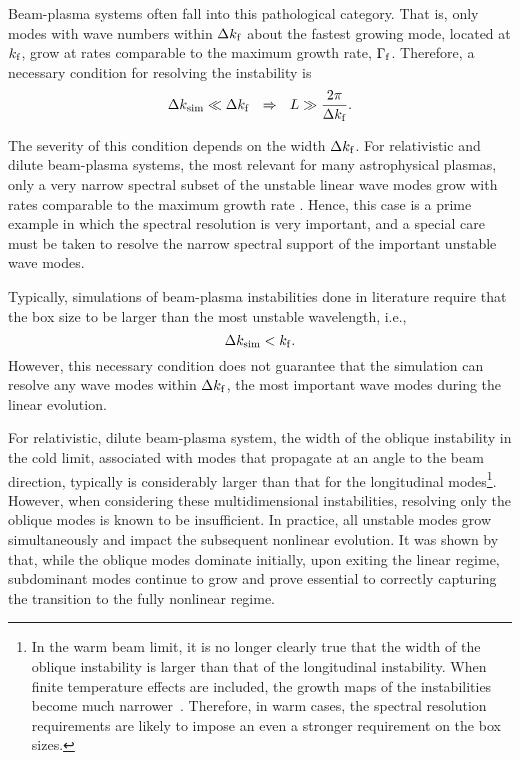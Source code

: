 \documentclass[pop,numberedappendix,iop]{aeb_emulateapj_2015}
\begin{document}
Beam-plasma systems often fall into this pathological category.
That is, only modes with wave numbers within $\Delta k_{\rm f}$ about the fastest growing mode, located at $k_{\rm f}$, grow at rates comparable to the maximum growth rate, $\Gamma_{\rm f}$.  
Therefore, a necessary condition for resolving the instability is
\begin{eqnarray}
\label{eq:spec-res}
\Delta k_{\rm sim} \ll \Delta k_{\rm f }
~~\Rightarrow~~
L \gg \frac{2\pi}{\Delta k_{\rm f}}.
\end{eqnarray}


The severity of this condition depends on the width $\Delta k_{\rm f}$.
For relativistic and dilute beam-plasma systems, the most relevant for many astrophysical plasmas, only a very narrow spectral subset of the unstable linear wave modes grow with rates comparable to the maximum growth rate \citep{Bret2010}.
Hence, this case is a prime example in which the spectral resolution is very important, and a special care must be taken to resolve the narrow spectral support of the important unstable wave modes.

Typically, simulations of beam-plasma instabilities done in literature require that the box size to be larger than the most unstable wavelength, i.e.,
\begin{equation}
 \Delta k_{\rm sim} < k_{\rm f}.
\end{equation}
However, this necessary condition does not guarantee that the simulation can resolve any wave modes within $\Delta k_{\rm f}$, the most important wave modes during the linear evolution.

 
For relativistic, dilute beam-plasma system, the width of the oblique instability in the cold limit, associated with modes that propagate at an angle to the beam direction, typically  is considerably larger than that for the longitudinal modes\footnote{In the warm beam limit, it is no longer clearly true that the width of the oblique instability is larger than that of the longitudinal instability.  When finite temperature effects are included, the growth maps of the instabilities become much narrower~\citep[see, e.g., the various panels in Figure 17 of ][]{Bret2010}. Therefore, in warm cases, the spectral resolution requirements are likely to impose an even a stronger requirement on the box sizes.}.
However, when considering these multidimensional instabilities, resolving only the oblique modes is known to be insufficient.
In practice, all unstable modes grow simultaneously and impact the subsequent nonlinear evolution. It was shown by \citet[][see especially the discussion in Section V.D]{Bret2010} that,
while the oblique modes dominate initially, upon exiting the linear regime, subdominant modes continue to grow and prove essential to correctly capturing the transition to the fully nonlinear regime.
\end{document}
